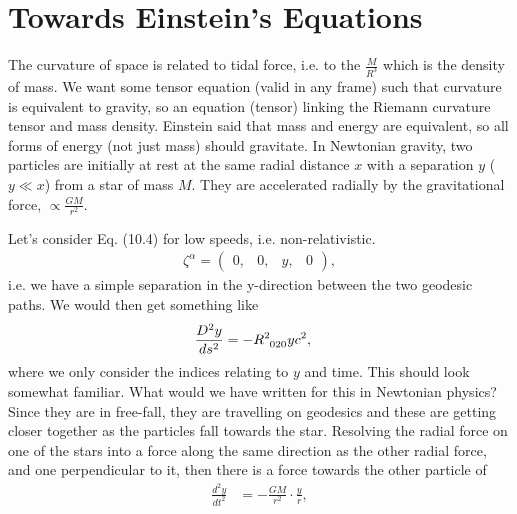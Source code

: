 \documentclass[a4paper, 11pt, normalem]{report}
\begin{document}
\section{Towards Einstein's Equations}
The curvature of space is related to tidal force, i.e. to the $\frac{M}{R^3}$ which is the density of mass. 
We want some tensor equation (valid in any frame) such that curvature is equivalent to gravity, so an equation (tensor) linking the Riemann curvature tensor and mass density.
Einstein said that mass and energy are equivalent, so all forms of energy (not just mass) should gravitate.
In Newtonian gravity, two particles are initially at rest at the same radial distance $x$ with a separation $y$ ($y\ll x$) from a star of mass $M$.
They are accelerated radially by the gravitational force, $\propto \frac{GM}{r^2}$.
\begin{figure}[H]
    \centering
\end{figure}
Let's consider Eq. (10.4) for low speeds, i.e. non-relativistic.
\begin{align}
    \zeta^\alpha = \begin{pmatrix} 0, & 0, & y, & 0 \end{pmatrix},
\end{align}
i.e. we have a simple separation in the y-direction between the two geodesic paths.
We would then get something like
\begin{align}
    \frac{D^2y}{ds^2} &= -\tensor{R}{^2_{020}}yc^2,
\end{align}
where we only consider the indices relating to $y$ and time.
This should look somewhat familiar.
What would we have written for this in Newtonian physics?
Since they are in free-fall, they are travelling on geodesics and these are getting closer together as the particles fall towards the star. 
Resolving the radial force on one of the stars into a force along the same direction as the other radial force, and one perpendicular to it, then there is a force towards the other particle of
\begin{align}
    \frac{d^2y}{dt^2} &= -\frac{GM}{r^2}\cdot\frac{y}{r},
\end{align}
\end{document}
